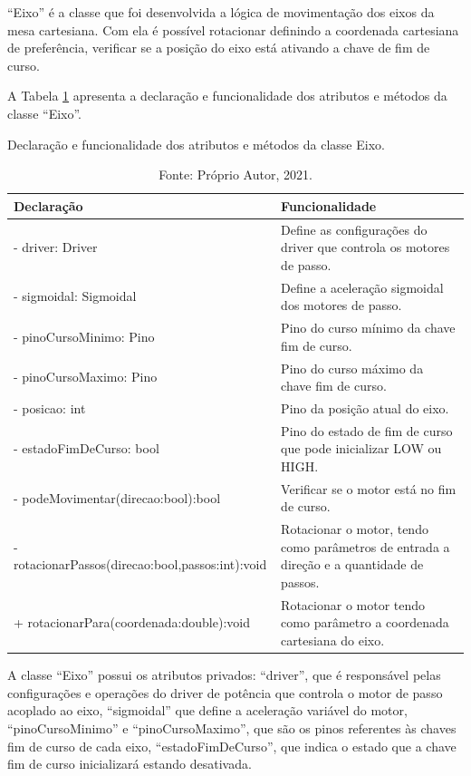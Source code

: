 “Eixo” é a classe que foi desenvolvida a lógica de movimentação dos eixos da mesa cartesiana. Com ela é 
possível rotacionar definindo a coordenada cartesiana de preferência, verificar se a posição do eixo 
está ativando a chave de fim de curso.

A Tabela \ref{tab:classeeixo} apresenta a declaração e funcionalidade dos atributos e métodos da 
classe “Eixo”.

\begin{table}[!htb]
    \centering
    \caption{Declaração e funcionalidade dos atributos e métodos da classe Eixo.}
    \begin{tabular}{lp{6cm}}
        \hline
        \textbf{Declaração} & \textbf{Funcionalidade}\\
        \hline
        - driver: Driver & Define as configurações do driver que controla os motores de passo.\\
        - sigmoidal: Sigmoidal & Define a aceleração sigmoidal dos motores de passo.\\
        - pinoCursoMinimo: Pino & Pino do curso mínimo da chave fim de curso.\\
        - pinoCursoMaximo: Pino & Pino do curso máximo da chave fim de curso.\\
        - posicao: int & Pino da posição atual do eixo.\\
        - estadoFimDeCurso: bool & Pino do estado de fim de curso que pode inicializar LOW ou HIGH.\\
        - podeMovimentar(direcao:bool):bool & Verificar se o motor está no fim de curso.\\
        - rotacionarPassos(direcao:bool,passos:int):void & Rotacionar o motor, tendo como parâmetros de entrada a direção e a quantidade de passos.\\
        + rotacionarPara(coordenada:double):void & Rotacionar o motor tendo como parâmetro a coordenada cartesiana do eixo.\\
        \hline       
    \end{tabular}
    \caption*{Fonte: Próprio Autor, 2021.}
    \label{tab:classeeixo}
\end{table}

A classe “Eixo” possui os atributos privados: “driver”, que é responsável pelas configurações e operações 
do driver de potência que controla o motor de passo acoplado ao eixo, “sigmoidal” que define a aceleração 
variável do motor, “pinoCursoMinimo” e “pinoCursoMaximo”, que são os pinos referentes às chaves fim de 
curso de cada eixo, “estadoFimDeCurso”, que indica o estado que a chave fim de curso inicializará estando 
desativada. 

